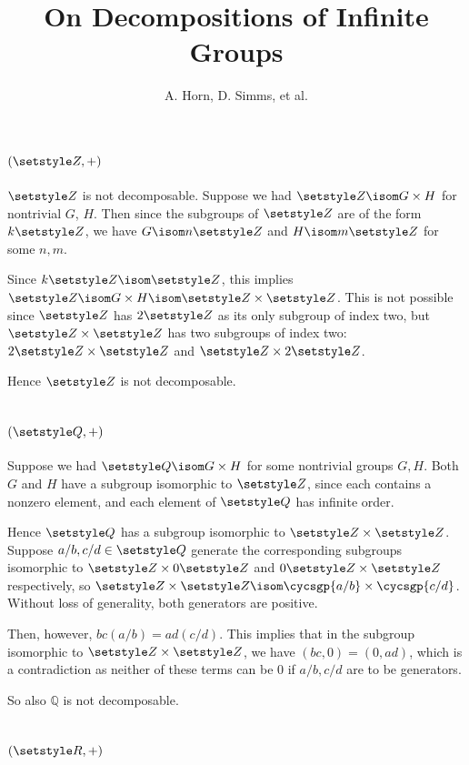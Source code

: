 \documentclass[fleqn,a4paper,11pt]{article}
\title{On Decompositions of Infinite Groups}
\author{A. Horn, D. Simms, et al.}
\begin{document}
\maketitle

\section{\((\Integers, +)\)}
\(\Integers\) is not decomposable. Suppose we had
\(\Integers \isom G \times H\) for nontrivial \(G\), \(H\). Then since the
subgroups of \(\Integers\) are of the form \(k\Integers\), we have
\(G \isom n\Integers\) and \(H \isom m\Integers\) for some \(n, m\).

Since \(k\Integers \isom \Integers\), this implies
\(\Integers \isom G \times H \isom \Integers \times \Integers\). This is not
possible since \(\Integers\) has \(2\Integers\) as its only subgroup of index
two, but \(\Integers \times \Integers\) has two subgroups of index two:
\(2\Integers \times \Integers\) and \(\Integers \times 2\Integers\).

Hence \(\Integers\) is not decomposable.

\section{\((\Rationals, +)\)}

Suppose we had \(\Rationals \isom G \times H\) for some nontrivial groups
\(G, H\). Both \(G\) and \(H\) have a subgroup isomorphic to \(\Integers\),
since each contains a nonzero element, and each element of \(\Rationals\) has
infinite order.

Hence \(\Rationals\) has a subgroup isomorphic to
\(\Integers \times \Integers\). Suppose \(a/b, c/d \in \Rationals\) generate the
corresponding subgroups isomorphic to
\(\Integers \times 0\Integers\) and \(0\Integers \times \Integers\)
respectively, so
\(\Integers \times \Integers \isom \cycsgp{a/b} \times \cycsgp{c/d}\).
Without loss of generality, both generators are positive.

Then, however, \(bc(a/b) = ad(c/d)\). This implies that in the subgroup
isomorphic to \(\Integers \times \Integers\), we have
\((bc, 0) = (0, ad)\), which is a contradiction as neither of these terms can be
\(0\) if \(a/b, c/d\) are to be generators.

So also \(\mathbb Q\) is not decomposable.

\section{\((\Reals, +)\)}
\end{document}
